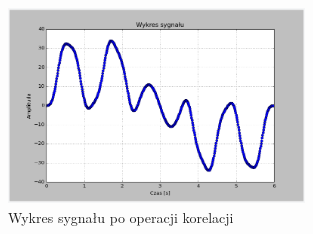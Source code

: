 \documentclass{article}
\begin{document}
{{    \begin{figure}[h!]
    \centering
    \includegraphics[width=0.7\textwidth]{img/kor_3.png}
    \caption{Wykres sygnału po operacji korelacji}
    \end{figure}
    \FloatBarrier
    }
}
\end{document}
